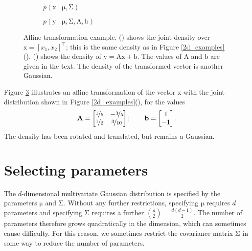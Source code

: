 \documentclass{article}
\newcommand{\given}{\mid}
\newcommand{\trans}{^\top}
\newcommand{\mat}[1]{\bm{\mathrm{#1}}}
\renewcommand{\vec}[1]{\bm{\mathrm{#1}}}
\begin{document}
\begin{figure}
  \centering
  \begin{subfigure}[t]{0.49\textwidth}
    
    \caption{$p(\vec{x} \given \vec{\mu}, \mat{\Sigma})$}
    \label{transformed_2d_pdf}
  \end{subfigure}
  \begin{subfigure}[t]{0.49\textwidth}
    
    \caption{$p(\vec{y} \given \vec{\mu}, \mat{\Sigma}, \mat{A}, \vec{b})$}
    \label{transformed_pdf}
  \end{subfigure}
  \caption{Affine transformation example.
    () shows the joint density over
    $\vec{x} = [x_1, x_2]\trans$; this is the same density as in
    Figure \ref{2d_examples}().
    () shows the density of $\vec{y} =
    \mat{A}\vec{x} + \vec{b}$. The values of $\mat{A}$ and $\vec{b}$
    are given in the text.  The density of the transformed vector is
    another Gaussian.}
  \label{transformed_example}
\end{figure}

Figure \ref{transformed_example} illustrates an affine transformation
of the vector $\vec{x}$ with the joint distribution shown in Figure
\ref{2d_examples}(), for the values
\begin{equation*}
  \mat{A}
  =
  \begin{bmatrix}
    \nicefrac{1}{5} & -\nicefrac{3}{5} \\
    \nicefrac{1}{2} & \nicefrac{3}{10}
  \end{bmatrix};
  \qquad
  \vec{b}
  =
  \begin{bmatrix}
    1 \\
    -1
  \end{bmatrix}.
\end{equation*}
The density has been rotated and translated, but remains a Gaussian.

\section*{Selecting parameters}

The $d$-dimensional multivariate Gaussian distribution is specified by
the parameters $\vec{\mu}$ and $\mat{\Sigma}$.  Without any further
restrictions, specifying $\vec{\mu}$ requires $d$ parameters and
specifying $\mat{\Sigma}$ requires a further $\binom{d}{2} = \frac{d(d
  -1)}{2}$.  The number of parameters therefore grows quadratically in
the dimension, which can sometimes cause difficulty.  For this reason,
we sometimes restrict the covariance matrix $\vec{\Sigma}$ in some way
to reduce the number of parameters.
\end{document}

